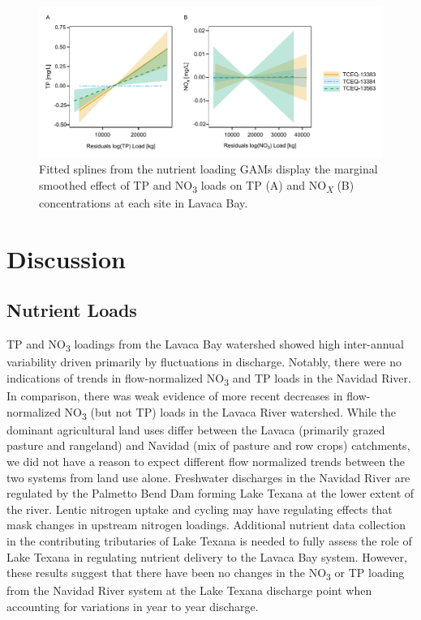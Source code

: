 \documentclass[fleqn,10pt,lineno]{wlpeerj} %
\providecommand{\DIFaddbeginFL}{} %
\providecommand{\DIFaddendFL}{} %
\providecommand{\DIFdelbeginFL}{} %
\providecommand{\DIFdelendFL}{} %
\begin{document}
\begin{figure}

{\centering \DIFdelbeginFL %
\DIFdelendFL \DIFaddbeginFL \includegraphics[width=1\linewidth,]{Schramm-2023-08-PeerJ_files/figure-latex/fig7} 
\DIFaddendFL 

}

\caption{Fitted splines from the nutrient loading GAMs display the marginal smoothed effect of TP and NO\textsubscript{3} loads on TP (A) and NO\textsubscript{\textit{X}} (B) concentrations at each site in Lavaca Bay.}\label{fig:fig7}
\end{figure}

\hypertarget{discussion}{%
\section*{Discussion}\label{discussion}}

\hypertarget{nutrient-loads}{%
\subsection*{Nutrient Loads}\label{nutrient-loads}}

TP and NO\textsubscript{3} loadings from the Lavaca Bay watershed showed
high inter-annual variability driven primarily by fluctuations in
discharge. Notably, there were no indications of trends in
flow-normalized NO\textsubscript{3} and TP loads in the Navidad River.
In comparison, there was weak evidence of more recent decreases in
flow-normalized NO\textsubscript{3} (but not TP) loads in the Lavaca
River watershed. While the dominant agricultural land uses differ
between the Lavaca (primarily grazed pasture and rangeland) and Navidad
(mix of pasture and row crops) catchments, we did not have a reason to
expect different flow normalized trends between the two systems from
land use alone. Freshwater discharges in the Navidad River are regulated
by the Palmetto Bend Dam forming Lake Texana at the lower extent of the
river. Lentic nitrogen uptake and cycling may have regulating effects
that mask changes in upstream nitrogen loadings. Additional nutrient
data collection in the contributing tributaries of Lake Texana is needed
to fully assess the role of Lake Texana in regulating nutrient delivery
to the Lavaca Bay system. However, these results suggest that there have
been no changes in the NO\textsubscript{3} or TP loading from the
Navidad River system at the Lake Texana discharge point when accounting
for variations in year to year discharge.
\end{document}
